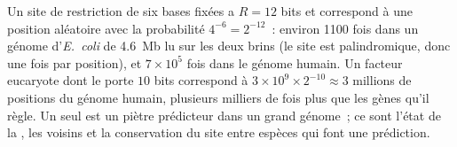 \begin{example}\label{ex:b3:bioinformatics:motif-numbers}
Un site de restriction de six bases fixées a $R = 12$ bits et
correspond à une position aléatoire avec la probabilité
$4^{-6} = 2^{-12}$~: environ \num{1100} fois dans un génome
d'\emph{E.~coli} de \qty{4.6}{Mb} lu sur les deux brins (le site est
palindromique, donc une fois par position), et $7\times 10^{5}$ fois
dans le génome humain. Un facteur eucaryote dont le  porte $10$
bits correspond à $3\times 10^{9}\times 2^{-10} \approx 3$ millions de
positions du génome humain, plusieurs milliers de fois plus que les
gènes qu'il règle. Un  seul est un piètre prédicteur dans un grand
génome~; ce sont l'état de la , les  voisins et la
conservation du site entre espèces qui font une prédiction.
\end{example}

